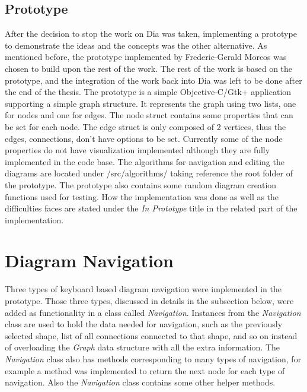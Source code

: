 \subsection{Prototype}
After the decision to stop the work on Dia was taken, implementing a prototype to demonstrate the ideas and the concepts was the other alternative. As mentioned before, the prototype implemented by Frederic-Gerald Morcos was chosen to build upon the rest of the work. The rest of the work is based on the prototype, and the integration of the work back into Dia was left to be done after the end of the thesis. The prototype is a simple Objective-C/Gtk+ application supporting a simple graph structure. It represents the graph using two lists, one for nodes and one for edges. The node struct contains some properties that can be set for each node. The edge struct is only composed of 2 vertices, thus the edges, connections, don't have options to be set. Currently some of the node properties do not have visualization implemented although they are fully implemented in the code base. The algorithms for navigation and editing the diagrams are located under /src/algorithms/ taking reference the root folder of the prototype. The prototype also contains some random diagram creation functions used for testing.  How the implementation was done as well as the difficulties faces are stated under the {\it In Prototype} title in the related part of the implementation.


\section{Diagram Navigation}
Three types of keyboard based diagram navigation were implemented in the prototype. Those three types, discussed in details in the subsection below, were added as functionality in a class called {\it Navigation}. Instances from the {\it Navigation} class are used to hold the data needed for navigation, such as the previously selected shape, list of all connections connected to that shape, and so on instead of overloading the {\it Graph} data structure with all the extra information. The {\it Navigation} class also has methods corresponding to many types of navigation, for example a method was implemented to return the next node for each type of navigation. Also the {\it Navigation} class contains some other helper methods.


